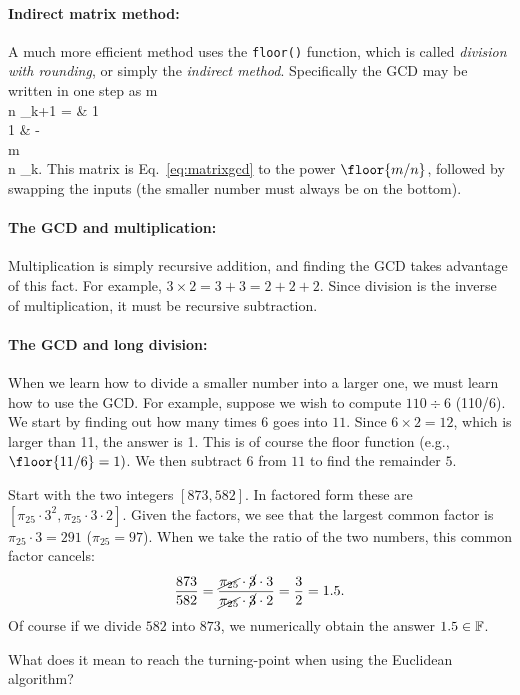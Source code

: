 \documentclass{ximera}
\begin{document}
\paragraph{Indirect matrix method:}
A much more efficient method
uses the \texttt{floor()} function, which is called \emph{division with rounding}, or simply the
\emph{indirect method}.
 
Specifically the GCD may be written in one step as 
\be
\bbm
m\\n
\ebm_{k+1}
 =
 & 1
 \\
1 & - \\
\ebm
\bbm
m\\n
\ebm_k.
\label{eq:gcd}
\ee
This matrix is Eq.~\ref{eq:matrixgcd} to the power $\floor{m/n}$, followed by swapping
the inputs (the smaller number must always be on the bottom).

\paragraph{The GCD and multiplication:} Multiplication is simply recursive addition, and finding the GCD
takes advantage of this fact.  For example, $3\times 2=3+3 = 2+2+2$. Since division is the inverse of
multiplication, it must be recursive subtraction.

\paragraph{The GCD and long division:} When we learn how to divide a smaller number into a larger one,
we must learn how to use the GCD. For example, suppose we wish to compute $110 \div 6$ (110/6).
We start by finding out how many times $6$ goes into $11$. Since $6\times 2=12$, which is larger than 11, the answer is 1.
This is of course the floor function (e.g., $\floor{11/6}=1)$.
We then subtract $6$ from $11$ to find the remainder $5$.

\Example
Start with the two integers $[873,582]$. 
In factored form these are $[\pi_{25}\cdot 3^2, \pi_{25}\cdot 3 \cdot 2]$. Given the factors, we see that
the largest common factor is $\pi_{25}\cdot 3=291$ ($\pi_{25}=97$).  When we take the ratio of the two
numbers, this common factor cancels:
\[
\frac{873}{582} = \frac{\cancel{\pi_{25}}\cdot \cancel3 \cdot 3}{\cancel{\pi_{25}}\cdot \cancel3 \cdot 2} = \frac{3}{2} = 1.5.
\]
Of course if we divide $582$ into $873$, we numerically obtain the answer $1.5 \in \mathbb{F}$. 

\BEx %
What does it mean to reach the turning-point when using the Euclidean algorithm?
\end{document}
